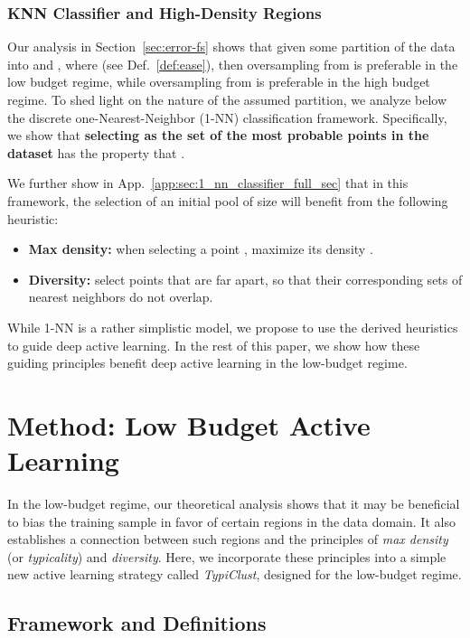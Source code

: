 \documentclass{article}
\newcommand{\app}{App.}
\begin{document}
\subsubsection{KNN Classifier and High-Density Regions}
\label{sec:high_density}

Our analysis in Section~\ref{sec:error-fs} shows that given some partition of the data into  and , where  (see Def.~\ref{def:ease}), then oversampling from  is preferable in the low budget regime, while oversampling from  is preferable in the high budget regime. To shed light on the nature of the assumed partition, we analyze below the discrete one-Nearest-Neighbor (1-NN) classification framework. Specifically, we show that \textbf{selecting  as the set of the most probable points in the dataset} has the property that . 

We further show in \app~\ref{app:sec:1_nn_classifier_full_sec} that in this framework, the selection of an initial pool of size  will benefit from the following heuristic: 
\begin{itemize}[noitemsep]
    \item \textbf{Max density:} when selecting a point , maximize its density .
    \item \textbf{Diversity:} select points that are far apart, so that their corresponding sets of nearest neighbors do not overlap.
\end{itemize}

While 1-NN is a rather simplistic model, we propose to use the derived heuristics to guide deep active learning. In the rest of this paper, we show how these guiding principles benefit deep active learning in the low-budget regime.


\section{Method: Low Budget Active Learning}
\label{sec:active_learning_low_budget}


In the low-budget regime, our theoretical analysis shows that it may be beneficial to bias the training sample in favor of certain regions in the data domain. It also establishes a connection between such regions and the principles of \emph{max density} (or \emph{typicality}) and \emph{diversity}. Here, we incorporate these principles into a simple new active learning strategy called \emph{TypiClust}, designed for the low-budget regime.


\subsection{Framework and Definitions}
\end{document}
